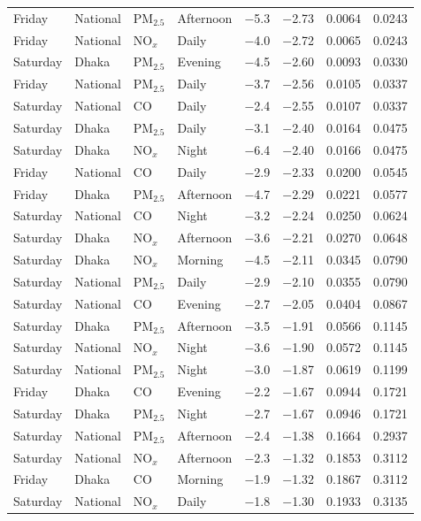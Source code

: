 \begin{longtable}{L{1.5cm} L{1.4cm} L{1.1cm} L{1.6cm} C{1.3cm} C{1.3cm} C{1.4cm} C{1.4cm}}
Friday & National & PM$_{2.5}$ & Afternoon & $-$5.3 & $-$2.73 & 0.0064 & 0.0243 \\
Friday & National & NO$_x$ & Daily & $-$4.0 & $-$2.72 & 0.0065 & 0.0243 \\
Saturday & Dhaka & PM$_{2.5}$ & Evening & $-$4.5 & $-$2.60 & 0.0093 & 0.0330 \\
Friday & National & PM$_{2.5}$ & Daily & $-$3.7 & $-$2.56 & 0.0105 & 0.0337 \\
Saturday & National & CO & Daily & $-$2.4 & $-$2.55 & 0.0107 & 0.0337 \\
Saturday & Dhaka & PM$_{2.5}$ & Daily & $-$3.1 & $-$2.40 & 0.0164 & 0.0475 \\
Saturday & Dhaka & NO$_x$ & Night & $-$6.4 & $-$2.40 & 0.0166 & 0.0475 \\
Friday & National & CO & Daily & $-$2.9 & $-$2.33 & 0.0200 & 0.0545 \\
Friday & Dhaka & PM$_{2.5}$ & Afternoon & $-$4.7 & $-$2.29 & 0.0221 & 0.0577 \\
Saturday & National & CO & Night & $-$3.2 & $-$2.24 & 0.0250 & 0.0624 \\
Saturday & Dhaka & NO$_x$ & Afternoon & $-$3.6 & $-$2.21 & 0.0270 & 0.0648 \\
Saturday & Dhaka & NO$_x$ & Morning & $-$4.5 & $-$2.11 & 0.0345 & 0.0790 \\
Saturday & National & PM$_{2.5}$ & Daily & $-$2.9 & $-$2.10 & 0.0355 & 0.0790 \\
Saturday & National & CO & Evening & $-$2.7 & $-$2.05 & 0.0404 & 0.0867 \\
Saturday & Dhaka & PM$_{2.5}$ & Afternoon & $-$3.5 & $-$1.91 & 0.0566 & 0.1145 \\
Saturday & National & NO$_x$ & Night & $-$3.6 & $-$1.90 & 0.0572 & 0.1145 \\
Saturday & National & PM$_{2.5}$ & Night & $-$3.0 & $-$1.87 & 0.0619 & 0.1199 \\
Friday & Dhaka & CO & Evening & $-$2.2 & $-$1.67 & 0.0944 & 0.1721 \\
Saturday & Dhaka & PM$_{2.5}$ & Night & $-$2.7 & $-$1.67 & 0.0946 & 0.1721 \\
Saturday & National & PM$_{2.5}$ & Afternoon & $-$2.4 & $-$1.38 & 0.1664 & 0.2937 \\
Saturday & National & NO$_x$ & Afternoon & $-$2.3 & $-$1.32 & 0.1853 & 0.3112 \\
Friday & Dhaka & CO & Morning & $-$1.9 & $-$1.32 & 0.1867 & 0.3112 \\
Saturday & National & NO$_x$ & Daily & $-$1.8 & $-$1.30 & 0.1933 & 0.3135 \\

\end{longtable}
